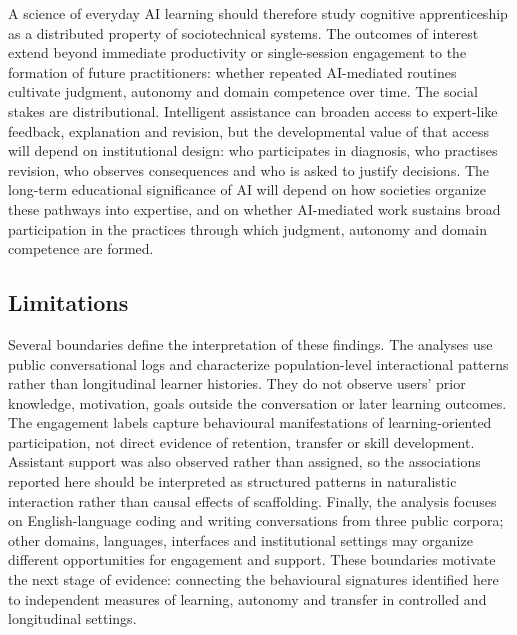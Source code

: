 A science of everyday AI learning should therefore study cognitive apprenticeship as a distributed property of sociotechnical systems. The outcomes of interest extend beyond immediate productivity or single-session engagement to the formation of future practitioners: whether repeated AI-mediated routines cultivate judgment, autonomy and domain competence over time. The social stakes are distributional. Intelligent assistance can broaden access to expert-like feedback, explanation and revision, but the developmental value of that access will depend on institutional design: who participates in diagnosis, who practises revision, who observes consequences and who is asked to justify decisions. The long-term educational significance of AI will depend on how societies organize these pathways into expertise, and on whether AI-mediated work sustains broad participation in the practices through which judgment, autonomy and domain competence are formed.


\subsection*{Limitations}

Several boundaries define the interpretation of these findings. The analyses use public conversational logs and characterize population-level interactional patterns rather than longitudinal learner histories. They do not observe users' prior knowledge, motivation, goals outside the conversation or later learning outcomes. The engagement labels capture behavioural manifestations of learning-oriented participation, not direct evidence of retention, transfer or skill development. Assistant support was also observed rather than assigned, so the associations reported here should be interpreted as structured patterns in naturalistic interaction rather than causal effects of scaffolding. Finally, the analysis focuses on English-language coding and writing conversations from three public corpora; other domains, languages, interfaces and institutional settings may organize different opportunities for engagement and support. These boundaries motivate the next stage of evidence: connecting the behavioural signatures identified here to independent measures of learning, autonomy and transfer in controlled and longitudinal settings.


